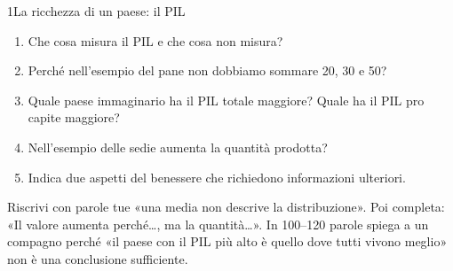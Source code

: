 \begin{lettura}{1}{La ricchezza di un paese: il PIL}
\begin{enumerate}
\item Che cosa misura il PIL e che cosa non misura?

\item Perché nell’esempio del pane non dobbiamo sommare 20, 30 e 50?

\item Quale paese immaginario ha il PIL totale maggiore? Quale ha il PIL pro capite maggiore?

\item Nell’esempio delle sedie aumenta la quantità prodotta?

\item Indica due aspetti del benessere che richiedono informazioni ulteriori.

\end{enumerate}
\lessico








\lingua
Riscrivi con parole tue «una media non descrive la distribuzione». Poi completa: «Il valore aumenta perché…, ma la quantità…».
\scrittura
In 100--120 parole spiega a un compagno perché «il paese con il PIL più alto è quello dove tutti vivono meglio» non è una conclusione sufficiente.

\end{lettura}


